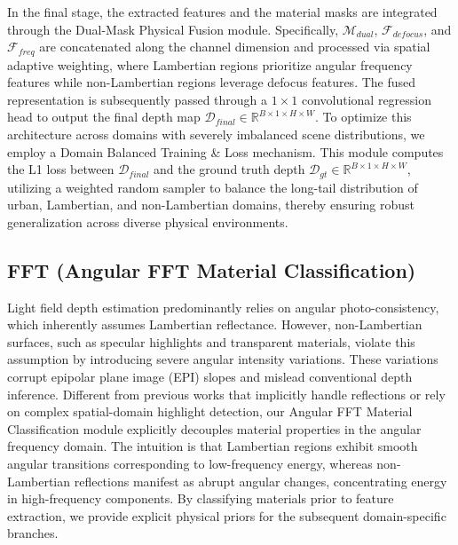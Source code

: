 In the final stage, the extracted features and the material masks are integrated through the Dual-Mask Physical Fusion module. Specifically, $\mathcal{M}_{dual}$, $\mathcal{F}_{defocus}$, and $\mathcal{F}_{freq}$ are concatenated along the channel dimension and processed via spatial adaptive weighting, where Lambertian regions prioritize angular frequency features while non-Lambertian regions leverage defocus features. The fused representation is subsequently passed through a $1 \times 1$ convolutional regression head to output the final depth map $\mathcal{D}_{final} \in \mathbb{R}^{B \times 1 \times H \times W}$. To optimize this architecture across domains with severely imbalanced scene distributions, we employ a Domain Balanced Training \& Loss mechanism. This module computes the L1 loss between $\mathcal{D}_{final}$ and the ground truth depth $\mathcal{D}_{gt} \in \mathbb{R}^{B \times 1 \times H \times W}$, utilizing a weighted random sampler to balance the long-tail distribution of urban, Lambertian, and non-Lambertian domains, thereby ensuring robust generalization across diverse physical environments.

\subsection{FFT (Angular FFT Material Classification)}

Light field depth estimation predominantly relies on angular photo-consistency, which inherently assumes Lambertian reflectance. However, non-Lambertian surfaces, such as specular highlights and transparent materials, violate this assumption by introducing severe angular intensity variations. These variations corrupt epipolar plane image (EPI) slopes and mislead conventional depth inference. Different from previous works that implicitly handle reflections or rely on complex spatial-domain highlight detection, our Angular FFT Material Classification module explicitly decouples material properties in the angular frequency domain. The intuition is that Lambertian regions exhibit smooth angular transitions corresponding to low-frequency energy, whereas non-Lambertian reflections manifest as abrupt angular changes, concentrating energy in high-frequency components. By classifying materials prior to feature extraction, we provide explicit physical priors for the subsequent domain-specific branches.

